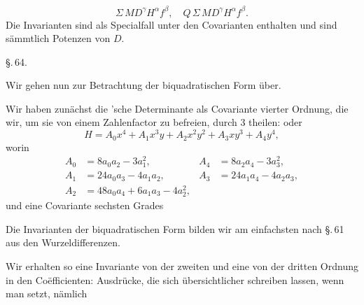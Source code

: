 \[
\Sigma \, M D^\gamma H^\alpha f^\beta, \quad Q \, \Sigma \, M D^\gamma H^\alpha f^\beta.
\]
Die Invarianten sind als Specialfall unter den Covarianten
enthalten und sind sämmtlich Potenzen von $D$.

\begin{center}
\S.\,64.

\end{center}

Wir gehen nun zur Betrachtung der biquadratischen Form
über.

Wir haben zunächst die 'sche Determinante als Covariante vierter Ordnung, die wir, um sie von einem Zahlenfactor
zu befreien, durch 3 theilen:
oder
\[
H = A_0 x^4 + A_1 x^3 y + A_2 x^2 y^2 + A_3 x y^3 + A_4 y^4,
\]
worin
\[
\begin{aligned}
A_0 &= 8 a_0 a_2 - 3 a_1^2, & A_4 &= 8 a_2 a_4 - 3 a_3^2, \\
A_1 &= 24 a_0 a_3 - 4 a_1 a_2, & A_3 &= 24 a_1 a_4 - 4 a_2 a_3, \\
A_2 &= 48 a_0 a_4 + 6 a_1 a_3 - 4 a_2^2, & &
\end{aligned}
\]
und eine Covariante sechsten Grades

Die Invarianten der biquadratischen Form bilden wir am
einfachsten nach \S.\,61 aus den Wurzeldifferenzen.

Wir erhalten so eine Invariante von der zweiten und eine
von der dritten Ordnung in den Coëfficienten:
Ausdrücke, die sich übersichtlicher schreiben lassen, wenn man
setzt, nämlich
